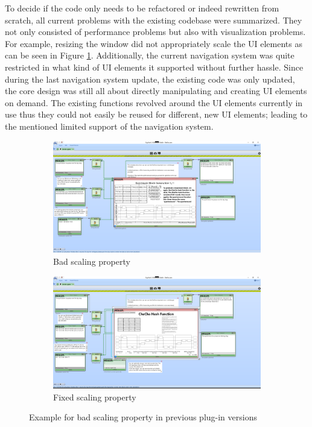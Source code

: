 To decide if the code only needs to be refactored or indeed rewritten from scratch, all current problems with the existing codebase were summarized. They not only consisted of performance problems but also with visualization problems. For example, resizing the window did not appropriately scale the UI elements as can be seen in Figure \ref{fig:plugin.scaling.bug}. Additionally, the current navigation system was quite restricted in what kind of UI elements it supported without further hassle. Since during the last navigation system update, the existing code was only updated, the core design was still all about directly manipulating and creating UI elements on demand. The existing functions revolved around the UI elements currently in use thus they could not easily be reused for different, new UI elements; leading to the mentioned limited support of the navigation system.

\begin{figure}
\begin{subfigure}{\textwidth}
\centering
\includegraphics[width=\textwidth]{figures/ct2/scaling-bug-example.png}
\caption{Bad scaling property}
\label{fig:plugin.scaling.bug}
\end{subfigure}
\begin{subfigure}{\textwidth}
\centering
\includegraphics[width=\textwidth]{figures/ct2/scaling-bug-fixed.png}
\caption{Fixed scaling property}
\label{fig:plugin.scaling.fix}
\end{subfigure}
\caption{Example for bad scaling property in previous plug-in versions}
\end{figure}

